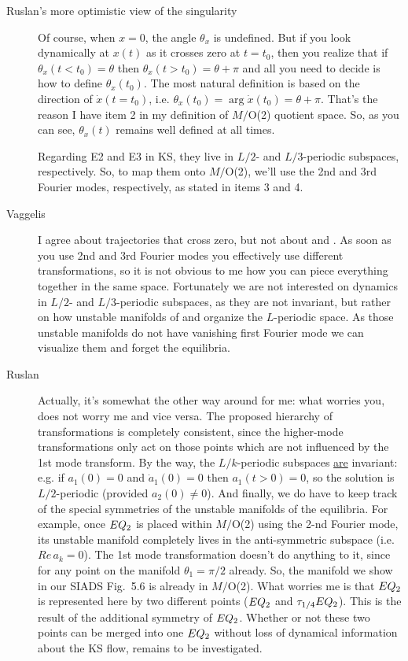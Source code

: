 \begin{description}
\item[Ruslan's more optimistic view of the singularity] Of
course, when $x = 0$, the angle $\theta_x$ is undefined.  But
if you look dynamically at $x(t)$ as it crosses zero at $t =
t_0$, then you realize that if $\theta_x(t < t_0) = \theta$
then $\theta_x(t > t_0) = \theta + \pi$ and all you need to
decide is how to define $\theta_x(t_0)$.  The most natural
definition is based on the direction of $\dot{x}(t = t_0)$,
i.e. $\theta_x(t_0) = \arg \dot{x}(t_0) = \theta + \pi$.
That's the reason I have item 2 in my definition of $M/$O(2)
quotient space.  So, as you can see, $\theta_x(t)$ remains
well defined at all times.

Regarding E2 and E3 in KS, they live in $L/2$- and
$L/3$-periodic subspaces, respectively.  So, to map them onto
$M/$O(2), we'll use the 2nd and 3rd Fourier modes,
respectively, as stated in items 3 and 4.

\item[Vaggelis]
I agree about trajectories that cross zero, but not about
 and . As soon as you use 2nd and 3rd Fourier
modes you effectively use different transformations, so it is
not obvious to me how you can piece everything together in
the same space. Fortunately we are not interested on dynamics
in $L/2$- and $L/3$-periodic subspaces, as they are not
invariant, but rather on how unstable manifolds of 
and  organize the $L$-periodic space. As those
unstable manifolds do not have vanishing first Fourier mode
we can visualize them and forget the equilibria.

\item[Ruslan]
  Actually, it's somewhat the other way
around for me: what worries you, does not worry me and vice
versa.  The proposed hierarchy of transformations is
completely consistent, since the higher-mode transformations
only act on those {\statesp} points which are not influenced
by the 1st mode transform.  By the way, the $L/k$-periodic
subspaces \underline{are} invariant: e.g. if $a_1(0) = 0$ and
$\dot{a}_1(0) = 0$ then $a_1(t>0) = 0$, so the solution is
$L/2$-periodic (provided $a_2(0) \neq 0$).  And finally, we
do have to keep track of the special symmetries of the
unstable manifolds of the equilibria.  For example, once
$EQ_{2}$ is placed within $M/$O(2) using the 2-nd Fourier
mode, its unstable manifold completely lives in the
anti-symmetric subspace (i.e. $Re\,a_k = 0$). {\color{blue}
The 1st mode transformation doesn't do anything to it, since
for any point on the manifold $\theta_1 = \pi/2$ already.}
So, the manifold we show in our SIADS Fig.~5.6 is already in
$M/$O(2).  What worries me is that $EQ_{2}$ is represented
here by two different points ($EQ_{2}$ and
$\tau_{1/4}EQ_{2}$).  This is the result of the additional
symmetry of $EQ_{2}$.  Whether or not these two points can
be merged into one $EQ_{2}$ without loss of dynamical
information about the KS flow, remains to be investigated.


\end{description}
